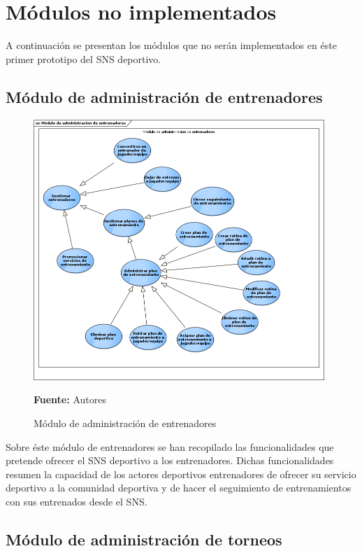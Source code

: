 \chapter{Módulos no implementados}
\label{app:cu_no_implementados}

A continuación se presentan los módulos que no serán implementados en éste primer prototipo del SNS deportivo.

\section{Módulo de administración de entrenadores}

\begin{figure}[!htb]
  \begin{center}
    \includegraphics[width=11cm]{./imagenes/casos_uso/gestion_entrenador.png}
    \caption{Módulo de administración de entrenadores}
    \label{fig:cu_admin_ent}
    \textbf{Fuente:} Autores
  \end{center}
\end{figure}

Sobre éste módulo de entrenadores se han recopilado las funcionalidades que pretende ofrecer el SNS deportivo a los entrenadores. Dichas funcionalidades resumen la capacidad de los actores deportivos entrenadores de ofrecer su servicio deportivo a la comunidad deportiva y de hacer el seguimiento de entrenamientos con sus entrenados desde el SNS.

\section{Módulo de administración de torneos}


